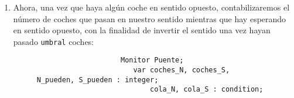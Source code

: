 \begin{ejercicio}
\begin{enumerate}
\begin{figure}[H]
\begin{multicols}{2}
\begin{verbatim}
                           procedure EntrarCocheDelNorte();
                           begin
                              { Hay coches en otro sentido }
                              if coches_S > 0 then 
                                 cola_N.wait();

                              coches_N := coches_N + 1;

                              { Por temas de eficiencia }
                              if coches_N.queue() then
                                 coches_N.signal();
                           end

                           procedure SalirCocheDelNorte();
                           begin
                              coches_N := coches_N - 1;

                              { El puente se queda vacío }
                              if coches_N = 0 then
                                 coches_S.signal();
                           end
                    \end{verbatim}
                    \begin{verbatim}
                           procedure EntrarCocheDelSur();
                           begin
                              { Hay coches en otro sentido }
                              if coches_N > 0 then 
                                 cola_S.wait();

                              coches_S := coches_S + 1;

                              { Por temas de eficiencia }
                              if coches_S.queue() then
                                 coches_S.signal();
                           end

                           procedure SalirCocheDelSur();
                           begin
                              coches_S := coches_S - 1;

                              { El puente se queda vacío }
                              if coches_S = 0 then
                                 coches_N.signal();
                           end

                           begin
                              coches_N := 0; coches_S := 0;
                           end
                        end
                    \end{verbatim}
                \end{multicols}
            \end{figure}
        \item Ahora, una vez que haya algún coche en sentido opuesto, contabilizaremos el número de coches que pasan en nuestro sentido mientras que hay esperando en sentido opuesto, con la finalidad de invertir el sentido una vez hayan pasado \verb|umbral| coches:
            \begin{figure}[H]
                \begin{verbatim}
                    Monitor Puente;
                       var coches_N, coches_S, N_pueden, S_pueden : integer;
                           cola_N, cola_S : condition;


\end{verbatim}
\end{figure}
\end{enumerate}
\end{ejercicio}
